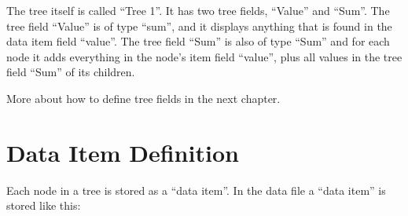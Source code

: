 \documentclass[letterpaper,10pt,english]{sphinxmanual}
\begin{document}
\begin{sphinxVerbatim}[commandchars=\\\{\}]
 
     
         
         \PYG{p}{[}\PYG{p}{]}
         \PYG{p}{[}\PYG{p}{]}
         \PYG{p}{[}\PYG{p}{]}
         \PYG{p}{[}\PYG{p}{]}
     
         
         \PYG{p}{[}\PYG{p}{]}
         \PYG{p}{[}\PYG{p}{]}
         \PYG{p}{[}\PYG{p}{]}
         \PYG{p}{[}\PYG{p}{]}
\end{sphinxVerbatim}

\sphinxAtStartPar
The tree itself is called “Tree 1”. It has two tree fields, “Value” and “Sum”. The tree field “Value” is of type “sum”, and it displays anything that is found in the data item field “value”. The tree field “Sum” is also of type “Sum” and for each node it adds everything in the node’s item field “value”, plus all values in the tree field “Sum” of its children.

\sphinxAtStartPar
More about how to define tree fields in the next chapter.


\section{Data Item Definition}
\label{\detokenize{data-format:data-item-definition}}
\sphinxAtStartPar
Each node in a tree is stored as a “data item”. In the data file a “data item” is stored like this:

\begin{sphinxVerbatim}[commandchars=\\\{\}]
 
         
     \PYG{p}{[}\PYG{p}{[}\PYG{p}{]} \PYG{p}{[}\PYG{p}{]}\PYG{p}{]}
\end{sphinxVerbatim}
\end{document}
